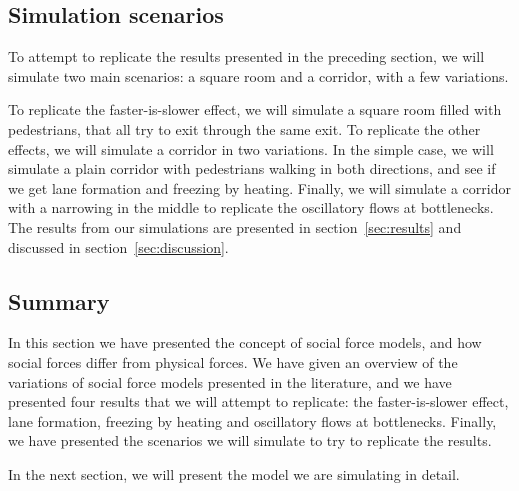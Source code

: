 \subsection{Simulation scenarios}
\label{sec:scenario-presentation}
To attempt to replicate the results presented in the preceding section, we 
will simulate two main scenarios: a square room and a corridor, with a few 
variations.

To replicate the faster-is-slower effect, we will simulate a square room 
filled with pedestrians, that all try to exit through the same exit. To 
replicate the other effects, we will simulate a corridor in two variations. In 
the simple case, we will simulate a plain corridor with pedestrians walking in 
both directions, and see if we get lane formation and freezing by heating.  
Finally, we will simulate a corridor with a narrowing in the middle to 
replicate the oscillatory flows at bottlenecks. The results from our 
simulations are presented in section~\ref{sec:results} and discussed in 
section~\ref{sec:discussion}.

\subsection{Summary}
In this section we have presented the concept of social force models, and how 
social forces differ from physical forces. We have given an overview of the 
variations of social force models presented in the literature, and we have 
presented four results that we will attempt to replicate: the faster-is-slower 
effect, lane formation, freezing by heating and oscillatory flows at 
bottlenecks. Finally, we have presented the scenarios we will simulate to try 
to replicate the results.

In the next section, we will present the model we are simulating in detail.
